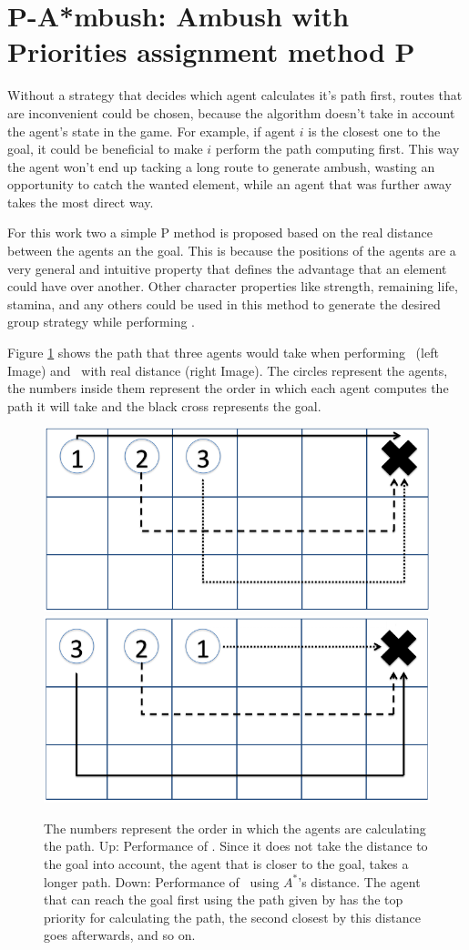 \section{ P-A*mbush: Ambush with Priorities assignment method P}

Without a strategy that decides which agent calculates it's path 
first, routes that are inconvenient could be chosen, because the 
algorithm doesn't take in account the agent's state in the game. 
For example, if agent $i$ is the closest one to the goal, it could 
be beneficial to make $i$ perform the path computing first. 
This way the agent won't end up tacking a long route to generate 
ambush, wasting an opportunity to catch the wanted element,
 while an agent that was further away takes the most direct way.
 
 For this work two a simple P method is proposed based on 
 the real distance between the agents an the goal. This is
 because the positions of the agents are a very general and
 intuitive property that defines the advantage that an element
 could have over another.
 Other character properties like strength, remaining
 life, stamina, and any others could be used in this method to 
 generate the desired group strategy while performing \ambush.
 
 Figure \ref{fig:grids} shows the path that three agents would take when 
 performing \ambush\ (left Image) and \pambush\ with
 real distance (right Image).
 The circles represent the agents, the numbers inside them represent the order
 in which each agent computes the path it will take and the black cross represents
 the goal.
 
 \begin{figure}[htp]
\centerline{
\includegraphics[width=0.4\columnwidth]{figures/ambush_grid.png}
\includegraphics[width=0.4\columnwidth]{figures/priorities_grid.png}
}
\caption{The numbers represent the order in which the agents
are calculating the path.
Up: Performance of \ambush. Since it does not take the distance to the
              goal into account, the agent that is closer to the goal, takes a longer path.
              Down: Performance of \pambush\ using $A^*$'s distance. The agent that
              can reach the goal first using the path given by \astar has the top priority for
              calculating the path, the second closest by this distance goes afterwards, and so on.}
\label{fig:grids}
\end{figure}

